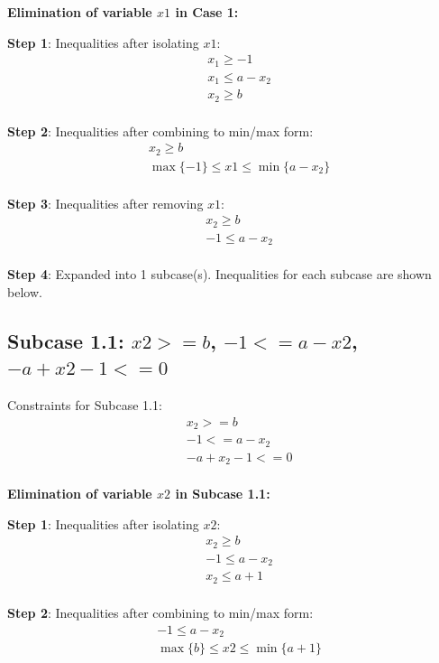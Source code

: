 \documentclass{article}
\begin{document}
\textbf{Elimination of variable $x1$ in Case 1:}

\textbf{Step 1}: Inequalities after isolating $x1$:
\begin{align}
& x_{1} \geq -1 \\
& x_{1} \leq a - x_{2} \\
& x_{2} \geq b \\
\end{align}

\textbf{Step 2}: Inequalities after combining to min/max form:
\begin{align}
& x_{2} \geq b \\
& \max\{-1\} \leq x1 \leq \min\{a - x_{2}\} \\
\end{align}

\textbf{Step 3}: Inequalities after removing $x1$:
\begin{align}
& x_{2} \geq b \\
& -1 \leq a - x_{2} \\
\end{align}

\textbf{Step 4}: Expanded into 1 subcase(s). Inequalities for each subcase are shown below.

\subsection{Subcase 1.1: $x2 >= b$, $-1 <= a - x2$, $-a + x2 - 1 <= 0$}

Constraints for Subcase 1.1:
\begin{align}
& x_{2} >= b \\
& -1 <= a - x_{2} \\
& - a + x_{2} - 1 <= 0 \\
\end{align}

\textbf{Elimination of variable $x2$ in Subcase 1.1:}

\textbf{Step 1}: Inequalities after isolating $x2$:
\begin{align}
& x_{2} \geq b \\
& -1 \leq a - x_{2} \\
& x_{2} \leq a + 1 \\
\end{align}

\textbf{Step 2}: Inequalities after combining to min/max form:
\begin{align}
& -1 \leq a - x_{2} \\
& \max\{b\} \leq x2 \leq \min\{a + 1\} \\
\end{align}
\end{document}
